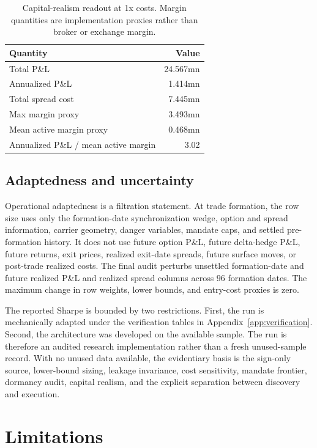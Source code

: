 \documentclass[11pt,a4paper]{amsart}
\newcommand{\tablecaptionskip}{\vspace{0.18em}}
\theoremstyle{plain}
\theoremstyle{definition}
\theoremstyle{remark}
\begin{document}
\begin{table}[t]
\centering
\caption{Capital-realism readout at 1x costs.  Margin quantities are implementation proxies rather
than broker or exchange margin.}
\tablecaptionskip
\begin{tabular}{lr}
\toprule
Quantity & Value\\
\midrule
Total P\&L & 24.567mn\\
Annualized P\&L & 1.414mn\\
Total spread cost & 7.445mn\\
Max margin proxy & 3.493mn\\
Mean active margin proxy & 0.468mn\\
Annualized P\&L / mean active margin & 3.02\\
\bottomrule
\end{tabular}
\label{tab:capital-realism}
\end{table}

\subsection{Adaptedness and uncertainty}

Operational adaptedness is a filtration statement.  At trade formation, the row size uses only
the formation-date synchronization wedge, option and spread information, carrier geometry, danger
variables, mandate caps, and settled pre-formation history.  It does not use future option P\&L,
future delta-hedge P\&L, future returns, exit prices, realized exit-date spreads, future surface
moves, or post-trade realized costs.  The final audit perturbs unsettled formation-date and future
realized P\&L and realized spread columns across \(96\) formation dates.  The maximum change in row
weights, lower bounds, and entry-cost proxies is zero.

The reported Sharpe is bounded by two restrictions.  First, the run is mechanically adapted under
the verification tables in Appendix~\ref{app:verification}.  Second, the architecture was developed
on the available sample.  The run is therefore an audited research implementation rather than a
fresh unused-sample record.  With no unused data available, the evidentiary basis is the sign-only source,
lower-bound sizing, leakage invariance, cost sensitivity, mandate frontier, dormancy audit, capital
realism, and the explicit separation between discovery and execution.

\section{Limitations}\label{sec:limits}
\end{document}
